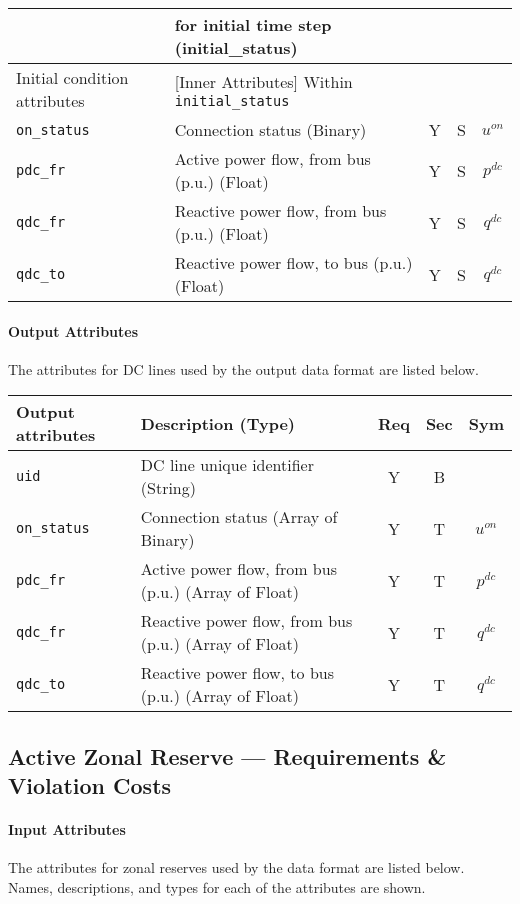 \documentclass{article}
\begin{document}
\begin{center}
\begin{tabular}{ l | l | c | c | c |}
       & for initial time step (initial\_status) &  &  &  \\
  \hline
  Initial condition attributes & [Inner Attributes] Within {\tt initial\_status} & & & \\
  \hline
  {\tt on\_status} & Connection status (Binary) & Y & S & $u^{on}$ \\
  {\tt pdc\_fr} & Active power flow, from bus (p.u.) (Float)& Y & S & $p^{dc}$ \\
  {\tt qdc\_fr} & Reactive power flow, from bus (p.u.) (Float)& Y & S & $q^{dc}$ \\
  {\tt qdc\_to} & Reactive power flow, to bus (p.u.) (Float)& Y & S & $q^{dc}$ \\
  \hline
\end{tabular}
\end{center}

\paragraph{Output Attributes}
 The attributes for DC lines
 used by the output data format are listed below.
\begin{center}
\small
\begin{tabular}{ l | l | c | c | c | }
Output attributes & Description (Type) & Req & Sec & Sym\\
\hline
  {\tt uid}    & DC line unique identifier (String)& Y & B & \\
  {\tt on\_status} & Connection status (Array of Binary) & Y & T & $u^{on}$ \\
  {\tt pdc\_fr} & Active power flow, from bus (p.u.) (Array of Float)& Y & T & $p^{dc}$ \\
  {\tt qdc\_fr} & Reactive power flow, from bus (p.u.) (Array of Float)& Y & T & $q^{dc}$ \\
  {\tt qdc\_to} & Reactive power flow, to bus (p.u.) (Array of Float)& Y & T & $q^{dc}$ \\
  \hline
\end{tabular}
\end{center}

\subsection{Active Zonal Reserve ---  Requirements \& Violation Costs}
\label{nom:reserves_active}

\paragraph{Input Attributes}
The attributes for zonal reserves
used by the data format are listed below.
Names, descriptions, and types for each of the attributes are shown.
\end{document}
